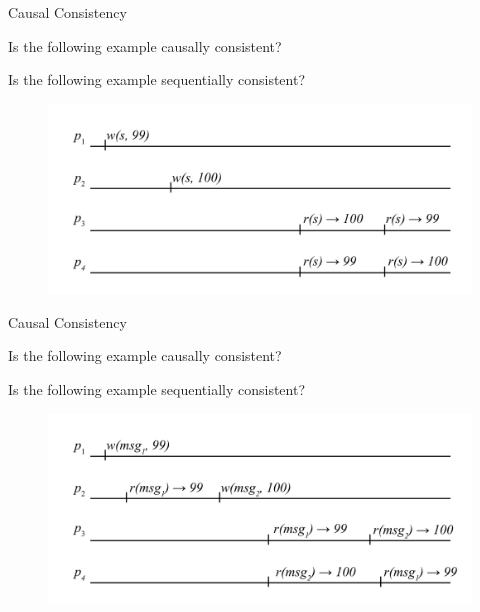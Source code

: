 \begin{frame}{Causal Consistency}
	
\begin{example}
\BI
\item Is the following example causally consistent? 
\item Is the following example sequentially consistent?	
\EI
\end{example}	
	
\begin{figure}
\includegraphics[width=\textwidth]{scenario3}
\end{figure}


\end{frame}

\begin{frame}{Causal Consistency}
	
\begin{example}
\BI
\item Is the following example causally consistent? 
\item Is the following example sequentially consistent?	
\EI
\end{example}	
	
\begin{figure}
\includegraphics[width=\textwidth]{scenario4}
\end{figure}


\end{frame}




